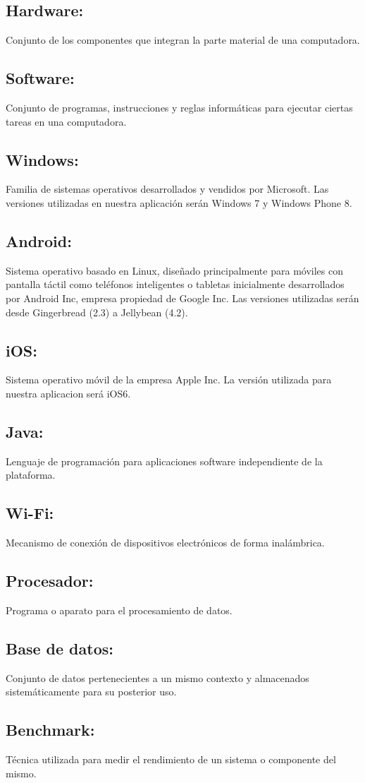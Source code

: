 \documentclass[spanish,a4paper,11pt, twoside]{report}	%
\begin{document}
\subsection{Hardware:} Conjunto de los componentes que integran la parte material de una computadora.
\subsection{Software:} Conjunto de programas, instrucciones y reglas informáticas para ejecutar ciertas tareas en una computadora.
\subsection{Windows:}Familia de sistemas operativos desarrollados y vendidos por Microsoft. Las versiones utilizadas en nuestra aplicación serán Windows 7 y Windows Phone 8.
\subsection{Android:} Sistema operativo basado en Linux, diseñado principalmente para móviles con pantalla táctil como teléfonos inteligentes o tabletas inicialmente desarrollados por Android Inc, empresa propiedad de Google Inc. Las versiones utilizadas serán desde Gingerbread (2.3) a Jellybean (4.2).
\subsection{iOS:} Sistema operativo móvil de la empresa Apple Inc. La versión utilizada para nuestra aplicacion será iOS6.
\subsection{Java:} Lenguaje de programación para aplicaciones software independiente de la plataforma.
\subsection{Wi-Fi:} Mecanismo de conexión de dispositivos electrónicos de forma inalámbrica.
\subsection{Procesador:} Programa o aparato para el procesamiento de datos.
\subsection{Base de datos:} Conjunto de datos pertenecientes a un mismo contexto y almacenados sistemáticamente para su posterior uso.
\subsection{Benchmark:} Técnica utilizada para medir el rendimiento de un sistema o componente del mismo.


\newpage
\mbox{}
\thispagestyle{empty}						%
\newpage

\end{document}
